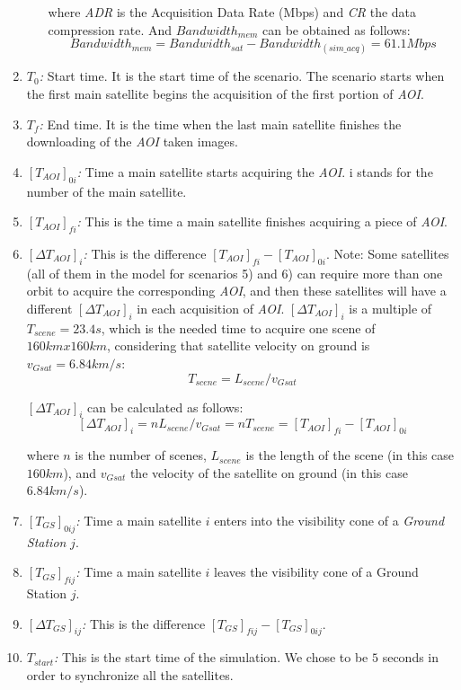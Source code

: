 \begin{enumerate}
\begin{itemize}
where \emph{ADR} is the Acquisition Data Rate (Mbps) and \emph{CR} the data
compression rate. And $Bandwidth_{mem}$ can be obtained as follows:
\begin{equation}\label{eq:bandwidth-mem}
  Bandwidth_{mem}=Bandwidth_{sat}-Bandwidth_{(sim\_acq)}=61.1Mbps
\end{equation}
\end{itemize}

\item \emph{$T_0$:} Start time. It is the start time of the scenario. The scenario starts when the first main satellite begins the acquisition of the first portion of \emph{AOI}.
\item \emph{$T_f$:} End time. It is the time when the last main satellite finishes the downloading of the \emph{AOI} taken images.
\item \emph{$[T_{AOI}]_{0i}$:} Time a main satellite starts acquiring the \emph{AOI}. i stands for the number of the main satellite.
\item \emph{$[T_{AOI}]_{fi}$:} This is the time a main satellite finishes acquiring a piece of \emph{AOI}.
\item \emph{$[\Delta T_{AOI}]_i$:} This is the difference
  $[T_{AOI}]_{fi}-[T_{AOI}]_{0i}$. Note: Some satellites (all of them in the
  model for scenarios 5) and 6) can require more than one orbit to acquire the
  corresponding \emph{AOI}, and then these satellites will have a different
  $[\Delta T_{AOI}]_i$ in each acquisition of \emph{AOI}. $[\Delta T_{AOI}]_i$
  is a multiple of  $T_{scene}=23.4 s$, which is the needed time to acquire one
  scene of $160km x 160km$, considering that satellite velocity on ground is
  $v_{Gsat}=6.84km/s$:
\begin{equation}\label{eq:Tscene}
	T_{scene}=L_{scene}/v_{Gsat}
\end{equation}

$[\Delta T_{AOI}]_i$  can be calculated as follows:
\begin{equation}\label{eq:deltataoi}
[\Delta T_{AOI}]_i=n L_{scene}/v_{Gsat} =nT_{scene}=[T_{AOI}]_{fi}-[T_{AOI}]_{0i}
\end{equation}

where $n$ is the number of scenes, $L_{scene}$  is the length of the scene (in this case $160km$), and $v_{Gsat}$ the velocity of the satellite on ground (in this case $6.84km/s$).
\item \emph{$[T_{GS}]_{0ij}$:} Time a main satellite $i$ enters into the visibility cone of a \emph{Ground Station} $j$.
\item \emph{$[T_{GS}]_{fij}$:} Time a main satellite $i$ leaves the visibility cone of a Ground Station  $j$.
\item \emph{$[\Delta T_{GS}]_{ij}$:} This is the difference $[T_{GS}]_{fij}-[T_{GS}]_{0ij}.$
\item \emph{$T_{start}$:} This is the start time of the simulation. We chose to be $5$ seconds in order to synchronize all the satellites.

\end{enumerate}

